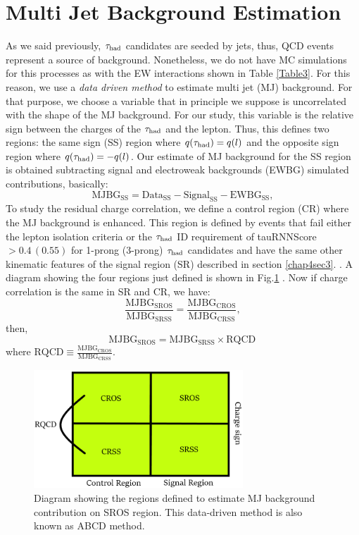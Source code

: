 \section{Multi Jet Background Estimation}
As we said previously, $\tau_\text{had}$ candidates are seeded by jets, thus, QCD events represent a source of background. Nonetheless, we do not have MC simulations for this processes as with the EW interactions shown in Table \ref{Table3}. For this reason, we use a \textit{data driven method} to estimate multi jet (MJ) background. For that purpose, we choose a variable that in principle we suppose is uncorrelated with the shape of the MJ background. For our study, this variable is the relative sign between the charges of the $\tau_\text{had}$ and the lepton. Thus, this defines two regions: the same sign (SS) region where $q(\tau_\text{had})=q(l)$ and the opposite sign region where $q(\tau_\text{had})=-q(l)$. Our estimate of MJ background for the SS region is obtained subtracting signal and electroweak backgrounds (EWBG) simulated contributions, basically:
\begin{equation}
\text{MJBG}_{\text{SS}}=\text{Data}_{\text{SS}}-\text{Signal}_{\text{SS}}-\text{EWBG}_{\text{SS}},
\end{equation}
 To study the residual charge correlation, we define a control region (CR) where the MJ background is enhanced. This region is defined by events that fail either the lepton isolation criteria or the $\tau_\text{had}$ ID requirement of tauRNNScore$>0.4\, (0.55)$ for 1-prong (3-prong) $\tau_\text{had}$ candidates and have the same other kinematic features of the signal region (SR) described in section \ref{chap4sec3}. . A diagram showing the four regions just defined is shown in Fig.\ref{Fig13} . Now if charge correlation is the same in SR and CR, we have:
 \begin{equation}
 \frac{\text{MJBG}_{\text{SROS}}}{\text{MJBG}_{\text{SRSS}}}=\frac{\text{MJBG}_{\text{CROS}}}{\text{MJBG}_{\text{CRSS}}},
 \end{equation}
then,
 \begin{equation}
\text{MJBG}_{\text{SROS}}=\text{MJBG}_{\text{SRSS}}\times \text{RQCD}\,
\end{equation}
where $\text{RQCD}\equiv\frac{\text{MJBG}_{\text{CROS}}}{\text{MJBG}_{\text{CRSS}}}$.
\begin{figure}[h]
	\centering
	\includegraphics[width=0.7\textwidth]{figures/Fig13}
	\caption{Diagram showing the regions defined to estimate MJ background contribution on SROS region. This data-driven method is also known as ABCD method.}
	\label{Fig13}
\end{figure}
 